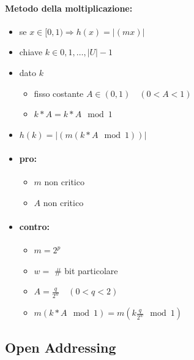 \paragraph{Metodo della moltiplicazione:}
\begin{itemize}
    \item se $x \in [0,1) \Rightarrow h(x) = |(mx)|$
    \item chiave $k \in 0,1,\ldots,|U|-1$
    \item dato $k$
    \begin{itemize}
        \item fisso costante $A \in (0,1) \quad (0<A<1)$
        \item $k * A = k * A \mod 1$
    \end{itemize}
    \item $h(k) = |(m(k*A\mod1))|$
    \item[] \paragraph{pro:}
    \begin{itemize}
        \item $m$ non critico
        \item $A$ non critico
    \end{itemize}
    \item[] \paragraph{contro:}
    \begin{itemize}
        \item $m = 2^p$
        \item $w =$ \# bit particolare
        \item $A = \frac{q}{2^w} \quad (0<q<2)$
        \item $m(k * A \mod 1) = m(k \frac{q}{2^w} \mod 1)$
    \end{itemize}
\end{itemize}

\newpage
\subsection{Open Addressing}
